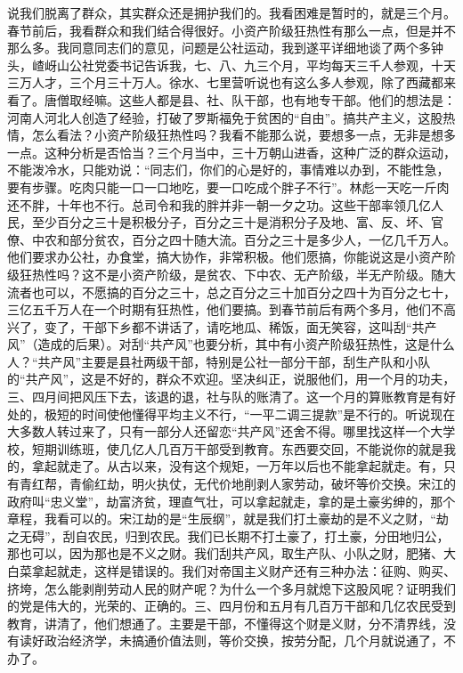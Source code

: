 说我们脱离了群众，其实群众还是拥护我们的。我看困难是暂时的，就是三个月。春节前后，我看群众和我们结合得很好。小资产阶级狂热性有那么一点，但是并不那么多。我同意同志们的意见，问题是公社运动，我到遂平详细地谈了两个多钟头，嵖岈山公社党委书记告诉我，七、八、九三个月，平均每天三千人参观，十天三万人才，三个月三十万人。徐水、七里营听说也有这么多人参观，除了西藏都来看了。唐僧取经嘛。这些人都是县、社、队干部，也有地专干部。他们的想法是：河南人河北人创造了经验，打破了罗斯福免于贫困的“自由”。搞共产主义，这股热情，怎么看法？小资产阶级狂热性吗？我看不能那么说，要想多一点，无非是想多一点。这种分析是否恰当？三个月当中，三十万朝山进香，这种广泛的群众运动，不能泼冷水，只能劝说：“同志们，你们的心是好的，事情难以办到，不能性急，要有步骤。吃肉只能一口一口地吃，要一口吃成个胖子不行”。林彪一天吃一斤肉还不胖，十年也不行。总司令和我的胖并非一朝一夕之功。这些干部率领几亿人民，至少百分之三十是积极分子，百分之三十是消积分子及地、富、反、坏、官僚、中农和部分贫农，百分之四十随大流。百分之三十是多少人，一亿几千万人。他们要求办公社，办食堂，搞大协作，非常积极。他们愿搞，你能说这是小资产阶级狂热性吗？这不是小资产阶级，是贫农、下中农、无产阶级，半无产阶级。随大流者也可以，不愿搞的百分之三十，总之百分之三十加百分之四十为百分之七十，三亿五千万人在一个时期有狂热性，他们要搞。到春节前后有两个多月，他们不高兴了，变了，干部下乡都不讲话了，请吃地瓜、稀饭，面无笑容，这叫刮“共产风”（造成的后果）。对刮“共产风”也要分析，其中有小资产阶级狂热性，这是什么人？“共产风”主要是县社两级干部，特别是公社一部分干部，刮生产队和小队的“共产风”，这是不好的，群众不欢迎。坚决纠正，说服他们，用一个月的功夫，三、四月间把风压下去，该退的退，社与队的账清了。这一个月的算账教育是有好处的，极短的时间使他懂得平均主义不行，“一平二调三提款”是不行的。听说现在大多数人转过来了，只有一部分人还留恋“共产风”还舍不得。哪里找这样一个大学校，短期训练班，使几亿人几百万干部受到教育。东西要交回，不能说你的就是我的，拿起就走了。从古以来，没有这个规矩，一万年以后也不能拿起就走。有，只有青红帮，青偷红劫，明火执仗，无代价地削剥人家劳动，破坏等价交换。宋江的政府叫“忠义堂”，劫富济贫，理直气壮，可以拿起就走，拿的是土豪劣绅的，那个章程，我看可以的。宋江劫的是“生辰纲”，就是我们打土豪劫的是不义之财，“劫之无碍”，刮自农民，归到农民。我们已长期不打土豪了，打土豪，分田地归公，那也可以，因为那也是不义之财。我们刮共产风，取生产队、小队之财，肥猪、大白菜拿起就走，这样是错误的。我们对帝国主义财产还有三种办法：征购、购买、挤垮，怎么能剥削劳动人民的财产呢？为什么一个多月就熄下这股风呢？证明我们的党是伟大的，光荣的、正确的。三、四月份和五月有几百万干部和几亿农民受到教育，讲清了，他们想通了。主要是干部，不懂得这个财是义财，分不清界线，没有读好政治经济学，未搞通价值法则，等价交换，按劳分配，几个月就说通了，不办了。

